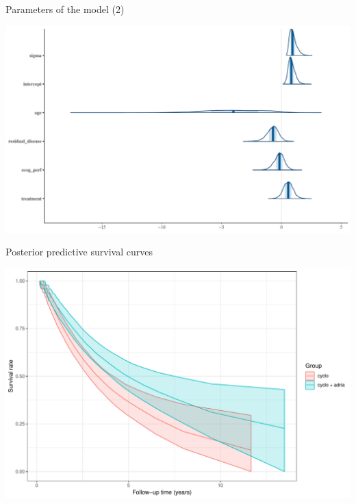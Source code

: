 \documentclass[ignorenonframetext,a4paper]{beamer}
\begin{document}
\begin{frame}{Parameters of the model (2)}

\includegraphics{DB_presentation_case_study_files/figure-beamer/unnamed-chunk-23-1.pdf}

\end{frame}

\begin{frame}{Posterior predictive survival curves}

\includegraphics{DB_presentation_case_study_files/figure-beamer/unnamed-chunk-24-1.pdf}

\end{frame}
\end{document}
